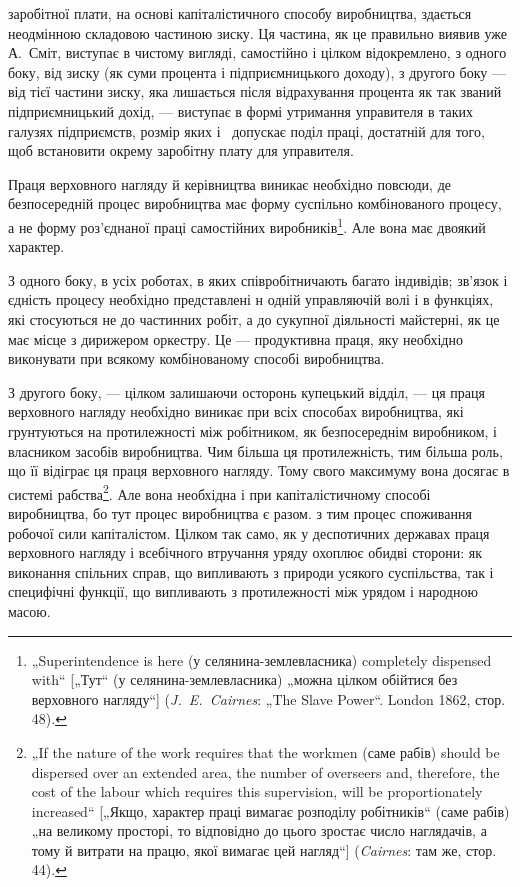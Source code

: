 \parcont{}  %
заробітної плати, на основі капіталістичного способу виробництва,
здається неодмінною складовою частиною зиску. Ця частина, як
це правильно виявив уже А.~Сміт, виступає в чистому вигляді,
самостійно і цілком відокремлено, з одного боку, від зиску (як
суми процента і підприємницького доходу), з другого боку —
від тієї частини зиску, яка лишається після відрахування процента
як так званий підприємницький дохід, — виступає в формі утримання
управителя в таких галузях підприємств, розмір яких
і~ допускає поділ праці, достатній для того, щоб встановити
окрему заробітну плату для управителя.

Праця верховного нагляду й керівництва виникає необхідно
повсюди, де безпосередній процес виробництва має форму суспільно
комбінованого процесу, а не форму роз’єднаної праці
самостійних виробників\footnote{
„Superintendence is here (у селянина-землевласника) completely dispensed
with“ [„Тут“ (у селянина-землевласника) „можна цілком обійтися без верховного
нагляду“] (\emph{J.~E.~Cairnes}: „The Slave Power“. London 1862, стор. 48).
}. Але вона має двоякий характер.

З одного боку, в усіх роботах, в яких співробітничають багато
індивідів; зв’язок і єдність процесу необхідно представлені н
одній управляючій волі і в функціях, які стосуються не до частинних
робіт, а до сукупної діяльності майстерні, як це має місце
з дирижером оркестру. Це — продуктивна праця, яку необхідно
виконувати при всякому комбінованому способі виробництва.

З другого боку, — цілком залишаючи осторонь купецький
відділ, — ця праця верховного нагляду необхідно виникає при
всіх способах виробництва, які грунтуються на протилежності
між робітником, як безпосереднім виробником, і власником засобів
виробництва. Чим більша ця протилежність, тим більша
роль, що її відіграє ця праця верховного нагляду. Тому свого
максимуму вона досягає в системі рабства\footnote{
„If the nature of the work requires that the workmen (саме рабів) should
be dispersed over an extended area, the number of overseers and, therefore, the
cost of the labour which requires this supervision, will be proportionately increased“
[„Якщо, характер праці вимагає розподілу робітників“ (саме рабів) „на
великому просторі, то відповідно до цього зростає число наглядачів, а тому й
витрати на працю, якої вимагає цей нагляд“] (\emph{Cairnes}: там же, стор. 44).
}. Але вона необхідна
і при капіталістичному способі виробництва, бо тут процес
виробництва є разом. з тим процес споживання робочої
сили капіталістом. Цілком так само, як у деспотичних державах
праця верховного нагляду і всебічного втручання уряду
охоплює обидві сторони: як виконання спільних справ, що випливають
з природи усякого суспільства, так і специфічні функції,
що випливають з протилежності між урядом і народною
масою.

